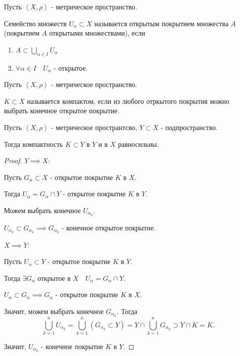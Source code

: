 
\begin{definition} \thmslashn 

    Пусть $\left<X, \rho\right>$ - метрическое пространство.

    Семейство множеств $U_{\alpha} \subset X$ называется открытым покрытием множества $A$ (покрытием $A$ открытыми множествами), если
    \begin{enumerate}
        \item $A \subset \bigcup_{\alpha\in I} U_{\alpha} $ 
        \item $\forall{\alpha\in I}\quad U_{\alpha}$ - открытое.
    \end{enumerate}
\end{definition}
\begin{definition} \thmslashn 

    Пусть $\left<X, \rho\right>$ - метрическое пространство.

    $K \subset X$ называется компактом, если из любого отркытого покрытия можно выбрать конечное открытое покрытие.
\end{definition}
\begin{theorem} \thmslashn

    Пусть $\left<X, \rho\right>$ - метрическое пространтсво, $Y \subset X$ - подпространство.

    Тогда компактность $K \subset Y$ в $Y$ и в $X$ равносильны.
    \begin{proof} \thmslashn
    
        $Y \implies X$:

        Пусть $G_{\alpha} \subset X$ - открытое покрытие $K$ в $X$.
        
        Тогда $U_{\alpha} = G_{\alpha}\cap Y$ - открытое покрытие $K$ в $Y$. 
        
        Можем выбрать конечное $U_{\alpha_{k}}$.
        
        $U_{\alpha_{k}} \subset G_{\alpha_{k}} \implies G_{\alpha_{k}}$ - конечное открытое покрытие.

        $X \implies Y$:

        Пусть $U_{\alpha} \subset Y$ - открытое покрытие $K$ в $Y$.

        Тогда $\exists{G_{\alpha} \text{ открытое в $X$}}\quad U_{\alpha} = G_{\alpha}\cap Y$.

        $U_{\alpha} \subset G_{\alpha} \implies G_{\alpha}$ - открытое покрытие $K$ в $X$.

        Значит, можем выбрать конечное $G_{\alpha_{k}}$. Тогда 
        \[ \bigcup_{k = 1}^{n} U_{\alpha_{k}} = \bigcup_{k = 1}^{n} (G_{\alpha_{k}} \subset Y) = Y\cap \bigcup_{k=1}^{n}G_{\alpha_{k}} \supset Y\cap K = K .\]

        Значит, $U_{\alpha_{k}}$ - конечное покрытие $K$ в $Y$.
    \end{proof}
\end{theorem}
